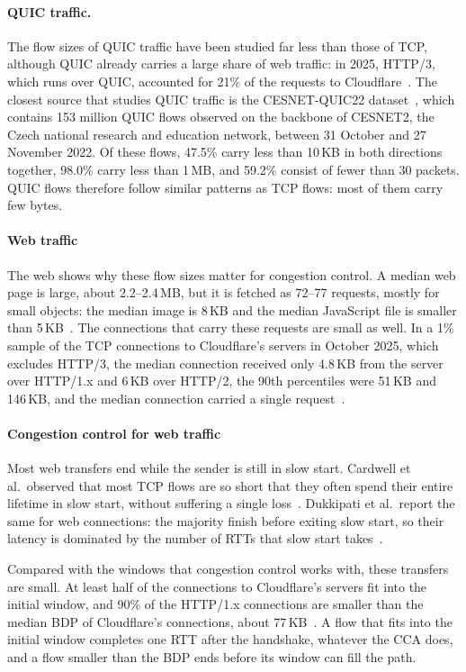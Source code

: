 \paragraph{QUIC traffic.} The flow sizes of QUIC traffic have been studied far less
than those of TCP, although QUIC already carries a large share of web traffic: in
2025, HTTP/3, which runs over QUIC, accounted for 21\% of the requests to
Cloudflare~\cite{cloudflare2025radar}. The closest source that studies QUIC traffic is the CESNET-QUIC22
dataset~\cite{luxemburk2023cesnet}, which contains 153 million QUIC flows observed on
the backbone of CESNET2, the Czech national research and education network, between
31 October and 27 November 2022. Of these flows, 47.5\% carry less than 10\,KB in
both directions together, 98.0\% carry less than 1\,MB, and 59.2\% consist of fewer
than 30 packets. QUIC flows therefore follow similar patterns as TCP flows: most of
them carry few bytes.

\paragraph{Web traffic} The web shows why these flow sizes matter for
congestion control. A median web page is large, about 2.2--2.4\,MB, but it is fetched
as 72--77 requests, mostly for small objects: the median image is 8\,KB and the
median JavaScript file is smaller than 5\,KB~\cite{httparchive2025pageweight}. The
connections that carry these requests are small as well. In a 1\% sample of the TCP
connections to Cloudflare's servers in October 2025, which excludes HTTP/3, the median
connection received only 4.8\,KB from the server over HTTP/1.x and 6\,KB over HTTP/2,
the 90th percentiles were 51\,KB and 146\,KB, and the median connection carried a
single request~\cite{cloudflare2025connections}.

\paragraph{Congestion control for web traffic} Most web transfers end while the
sender is still in slow start. Cardwell et al.\ observed that most TCP flows are so
short that they often spend their entire lifetime in slow start, without suffering a
single loss~\cite{cardwell2000modeling}. Dukkipati et al.\ report the same for web
connections: the majority finish before exiting slow start, so their latency is
dominated by the number of RTTs that slow start takes~\cite{dukkipati2010argument}.

Compared with the windows that congestion control works with, these transfers are
small. At least half of the connections to Cloudflare's servers fit into the initial
window, and 90\% of the HTTP/1.x connections are smaller than the median BDP of
Cloudflare's connections, about 77\,KB~\cite{cloudflare2025connections}. A flow that
fits into the initial window completes one RTT after the handshake, whatever the CCA
does, and a flow smaller than the BDP ends before its window can fill the path.

